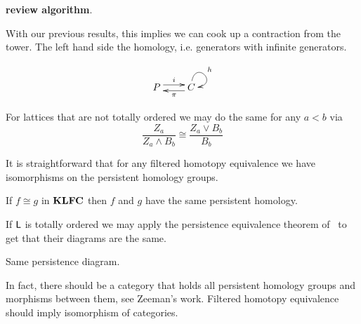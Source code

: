 {\bf review algorithm}.  

With our previous results, this implies we can cook up a contraction from the tower.  The left hand side the homology, i.e. generators with infinite generators.


\[
\xymatrixrowsep{0.03in}
\xymatrixcolsep{0.3in}
\xymatrix{
P  \ar[r]<3pt>^{i} & \ar[l]<3pt>^{\pi} C \ar@(u,r)^{h}
}
\]
 



For lattices that are not totally ordered we may do the same for any $a< b$ via 
\[
\frac{Z_a}{Z_a\wedge B_b} \cong \frac{Z_a\vee B_b}{B_b}
\]

It is straightforward that for any filtered homotopy equivalence we have isomorphisms on the persistent homology groups.

\begin{prop}
If $f\cong g$ in ${\bf KLFC}$ then $f$ and $g$ have the same persistent homology.
\end{prop}


If ${\mathsf L}$ is totally ordered we may apply the persistence equivalence theorem of~\cite{} to get that their diagrams are the same.

\begin{cor}
Same persistence diagram.
\end{cor}

In fact, there should be a category that holds all persistent homology groups and morphisms between them, see Zeeman's work.  Filtered homotopy equivalence should imply isomorphism of categories.

%
%
%
%
%
%
